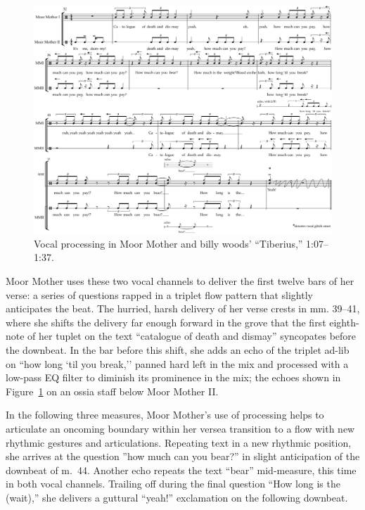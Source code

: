 \begin{figure}[!p]
    \centering
    \includegraphics[width=\textwidth]{images/figures/chp 03/107136tiberiusprocessing.pdf}
    \caption{Vocal processing in Moor Mother and billy woods' ``Tiberius,'' 1:07--1:37.}
    \label{fig:moormotherprocess}
\end{figure}

Moor Mother uses these two vocal channels to deliver the first twelve bars of her verse: a series
of questions rapped in a triplet flow pattern that slightly anticipates the beat. The hurried, 
harsh delivery of her verse crests in mm. 39--41, where she shifts the delivery far enough forward
in the grove that the first eighth-note of her tuplet on the text ``catalogue of death and dismay''
syncopates before the downbeat. In the bar before this shift, she adds an echo of the triplet ad-lib
on ``how long `til you break,'' panned hard left in the mix and processed with a low-pass EQ filter
to diminish its prominence in the mix; the echoes shown in Figure~\ref{fig:moormotherprocess} on
an ossia staff below Moor Mother II.

In the following three measures, Moor Mother's use of processing helps to articulate an oncoming 
boundary within her verse\textemdash a transition to a flow with new rhythmic gestures and articulations.
Repeating text in a new rhythmic position, she arrives at the question ''how much can you bear?'' 
in slight anticipation of the downbeat of m.~44. Another echo repeats the text ``bear'' mid-measure,
this time in both vocal channels. Trailing off during the final question ``How long is the (wait),''
she delivers a guttural ``yeah!'' exclamation on the following downbeat.

